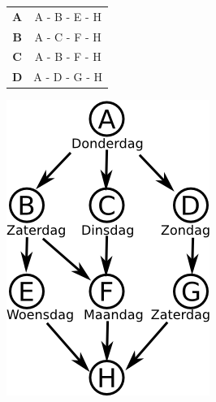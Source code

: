 \documentclass[12pt, a4paper]{article}
\begin{document}
\begin{minipage}{\textwidth}
\begin{minipage}{0.6\linewidth}
				\begin{table}[H]
					\centering
					\begin{tabular}{|c|c|}
						\hline
						\textbf{A} & A - B - E - H \\
						\textbf{B} & A - C - F - H \\ 
						\textbf{C} & A - B - F - H \\ 
						\textbf{D} & A - D - G - H \\
						\hline 
					\end{tabular}
				\end{table}
			\end{minipage} \hfill
			\begin{minipage}{0.34\linewidth}
					\includegraphics[width=\linewidth]{image1}
			\end{minipage}

	\end{minipage} \\ \\
		
\end{document}

